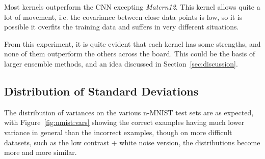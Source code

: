 \documentclass{article}
\begin{document}
Most kernels outperform the CNN excepting \textit{Matern12}. This kernel allows quite a lot of movement, i.e. the covariance between close data points is low, so it is possible it overfits the training data and suffers in very different situations.

From this experiment, it is quite evident that each kernel has some strengths, and none of them outperform the others across the board. This could be the basis of larger ensemble methods, and an idea discussed in Section~\ref{sec:discussion}.

\subsection{Distribution of Standard Deviations}

The distribution of variances on the various n-MNIST test sets are as expected, with Figure~\ref{fig:nmist:vars} showing the correct examples having much lower variance in general than the incorrect examples, though on more difficult datasets, such as the low contrast + white noise version, the distributions become more and more similar.
\end{document}
